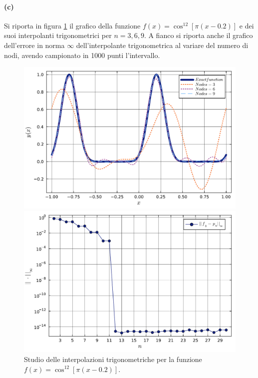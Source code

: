 \documentclass[letterpaper, 12pt]{article}
\begin{document}
\paragraph{(c) } Si riporta in figura \ref{fig:es4_6_1_3} il grafico della funzione $f(x) = \cos^{12}[\pi (x-0.2)]$
e dei suoi interpolanti trigonometrici per $n=3,6,9$. A fianco si riporta anche il grafico
dell'errore in norma $\infty$ dell'interpolante trigonometrica al variare del numero di nodi, avendo campionato
in 1000 punti l'intervallo.
\begin{figure}[!ht]
    \centering
    \begin{minipage}[b]{0.47\textwidth}
        \includegraphics[width=\textwidth]{4615.pdf}
    \end{minipage}
    \hspace{0.5cm}
    \begin{minipage}[b]{0.47\textwidth}
        \includegraphics[width=\textwidth]{4616.pdf}
    \end{minipage}
    \caption{Studio delle interpolazioni trigonometriche per la funzione $f(x) = \cos^{12}[\pi (x-0.2)]$.}
    \label{fig:es4_6_1_3}
\end{figure}
\end{document}
